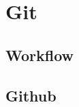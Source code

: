
\section{Git}\label{sec:git}

\renewcommand{\kapitelautor}{Autor: Irgendwer} %

\subsection{Workflow}\label{subsec:workflow}

%
%

\subsection{Github}\label{subsec:github}

%
%

\renewcommand{\kapitelautor}{}
